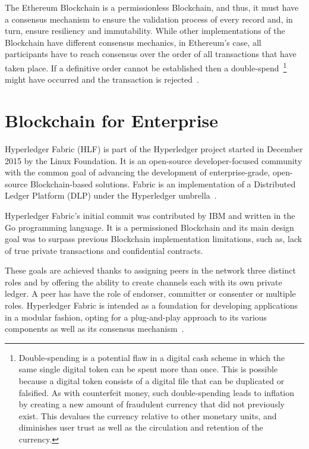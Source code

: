 The Ethereum Blockchain is a permissionless Blockchain, and thus, it must have
a consensus mechanism to ensure the validation process of every record and, in
turn, ensure resiliency and immutability. While other implementations of the
Blockchain have different consensus mechanics, in Ethereum’s case, all
participants have to reach consensus over the order of all transactions that
have taken place. If a definitive order cannot be established then a
double-spend~\footnote{Double-spending is a potential flaw in a digital cash
scheme in which the same single digital token can be spent more than once.
This is possible because a digital token consists of a digital file that can be
duplicated or falsified. As with counterfeit money, such double-spending leads
to inflation by creating a new amount of fraudulent currency that did not
previously exist. This devalues the currency relative to other monetary units,
and diminishes user trust as well as the circulation and retention of the
currency.} might have occurred and the transaction is rejected~\cite{Wood2017}.

\section{Blockchain for Enterprise}\label{enterpriseBlockchain}

Hyperledger Fabric (HLF) is part of the Hyperledger project started in December
2015 by the Linux Foundation. It is an open-source developer-focused community
with the common goal of advancing the development of enterprise-grade,
open-source Blockchain-based solutions.  Fabric is an implementation of a
Distributed Ledger Platform (DLP) under the Hyperledger
umbrella~\cite{Cachin2016}.

Hyperledger Fabric’s initial commit was contributed by IBM and written in the
Go programming language.  It is a permissioned Blockchain and its main design
goal was to surpass previous Blockchain implementation limitations, such as,
lack of true private transactions and confidential contracts.

These goals are achieved thanks to assigning peers in the network three
distinct roles and by offering the ability to create channels each with its own
private ledger.  A peer has have the role of endorser, committer or consenter
or multiple roles.  Hyperledger Fabric is intended as a foundation for
developing applications in a modular fashion, opting for a plug-and-play
approach to its various components as well as its consensus
mechanism~\cite{HyperledgerFabricDocs2017}.

